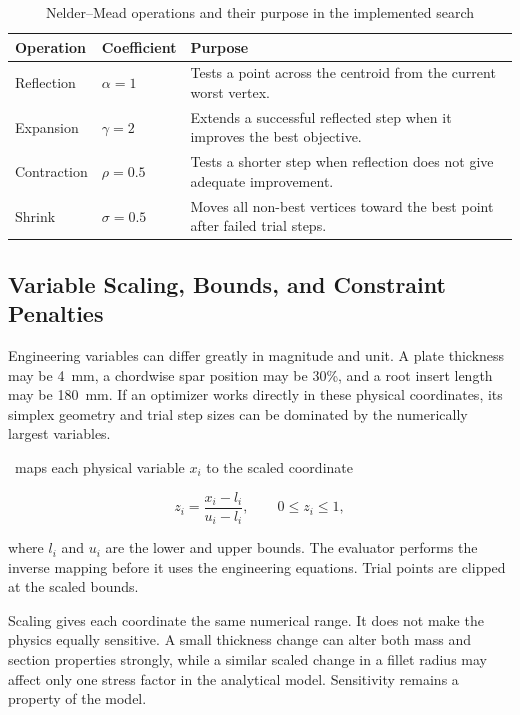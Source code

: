 \begin{table}[H]
\centering
\caption{Nelder--Mead operations and their purpose in the implemented search}
\label{tab:nm-operations}
\begin{tabularx}{\textwidth}{p{}p{}X}
\toprule
\textbf{Operation} & \textbf{Coefficient} & \textbf{Purpose}\\
\midrule
Reflection & $\alpha=1$ & Tests a point across the centroid from the current
worst vertex.\\
Expansion & $\gamma=2$ & Extends a successful reflected step when it improves
the best objective.\\
Contraction & $\rho=0.5$ & Tests a shorter step when reflection does not give
adequate improvement.\\
Shrink & $\sigma=0.5$ & Moves all non-best vertices toward the best point after
failed trial steps.\\
\bottomrule
\end{tabularx}
\end{table}

\subsection{Variable Scaling, Bounds, and Constraint Penalties}
\label{sec:scaling-review}

Engineering variables can differ greatly in magnitude and unit. A plate
thickness may be 4~mm, a chordwise spar position may be 30\%, and a root
insert length may be 180~mm. If an optimizer works directly in these physical
coordinates, its simplex geometry and trial step sizes can be dominated by
the numerically largest variables.

\NEMO\ maps each physical variable $x_i$ to the scaled coordinate

\begin{equation}
z_i=\frac{x_i-l_i}{u_i-l_i},
\qquad 0\leq z_i\leq 1,
\label{eq:variable-scaling}
\end{equation}

where $l_i$ and $u_i$ are the lower and upper bounds. The evaluator performs
the inverse mapping before it uses the engineering equations. Trial points are
clipped at the scaled bounds.

Scaling gives each coordinate the same numerical range. It does not make the
physics equally sensitive. A small thickness change can alter both mass and
section properties strongly, while a similar scaled change in a fillet radius
may affect only one stress factor in the analytical model. Sensitivity remains
a property of the model.

